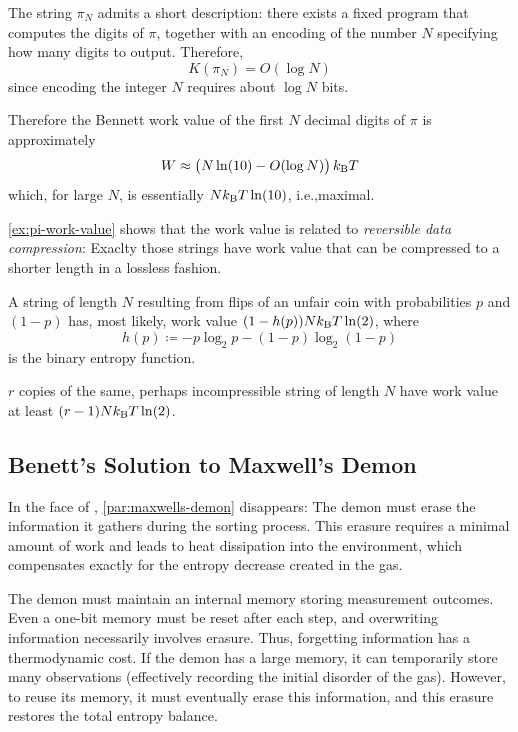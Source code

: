 \begin{example}\label{ex:pi-work-value}
The string $\pi_N$ admits a short description: there exists a fixed program
that computes the digits of $\pi$, together with an encoding of the number $N$
specifying how many digits to output. Therefore,
\[
K(\pi_N) = O(\log N)
\]
since encoding the integer $N$ requires about $\log N$ bits.

Therefore the Bennett work value of the first $N$ decimal digits of $\pi$ is approximately
\[
W \approx \bigl(N \ln(10) - O(\log N)\bigr)\,k_{\mathrm{B}} T
\]
which, for large $N$, is essentially $Nk_{\mathrm{B}} T \ln(10)$, i.e.,maximal.
\end{example}

\autoref{ex:pi-work-value} shows that the work value is related to \emph{reversible data compression}: 
Exaclty those strings have work value that can be compressed to a shorter length in a lossless fashion.
\begin{example}
A string of length $N$ resulting from flips of an unfair coin with probabilities $p$ and $(1-p)$ has, most likely, work value 
$(1 - h(p)) N k_{\mathrm{B}} T \ln(2)$, where 
\[
h(p) \coloneq -p \log_2 p - (1-p) \log_2 (1-p)
\]
is the binary entropy function.
\end{example}



\begin{example}\label{ex:copies-work-value}
$r$ copies of the same, perhaps incompressible string of length $N$ have work value at least $(r - 1) N k_{\mathrm{B}} T \ln(2)$.
\end{example}


\subsection{Benett's Solution to Maxwell's Demon}
\label{sec:solution-maxwells-demon}

In the face of , \autoref{par:maxwells-demon} disappears:
The demon must erase the information it gathers during the sorting process. 
This erasure requires a minimal amount of work and leads to heat dissipation into the environment, which compensates exactly for the entropy decrease created in the gas.

The demon must maintain an internal memory storing measurement outcomes. 
Even a one-bit memory must be reset after each step, and overwriting information necessarily involves erasure. 
Thus, forgetting information has a thermodynamic cost.
If the demon has a large memory, it can temporarily store many observations (effectively recording the initial disorder of the gas).
However, to reuse its memory, it must eventually erase this information, and this erasure restores the total entropy balance.

